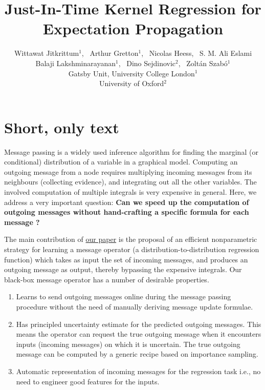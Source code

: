 \documentclass[a4paper,10pt]{article}
\title{Just-In-Time Kernel Regression for \\Expectation Propagation}
\author{
    Wittawat Jitkrittum$^1$, \, Arthur Gretton$^1$, \, Nicolas Heess, \, S. M. Ali Eslami \\
    \vspace{5mm}
    Balaji Lakshminarayanan$^1$, \, Dino Sejdinovic$^2$, \, Zolt{\'a}n Szab{\'o}$^1$ \\ 
%
Gatsby Unit, University College London$^1$ \\
University of Oxford$^2$ 
}
\begin{document}
\maketitle

\section*{Short, only text}

Message passing is a widely used inference algorithm for finding the marginal
(or conditional) distribution of a variable in a graphical model. Computing an
outgoing message from a node requires multiplying incoming messages from its
neighbours (collecting evidence), and integrating out all the other variables. 
The involved computation of multiple integrals is very expensive in general.
Here, we address a very important question: \textbf{Can we speed up the computation of outgoing
messages without hand-crafting a specific formula for each message ?}


The main contribution of \href{http://arxiv.org/abs/1503.02551}{our paper} is
the proposal of an efficient nonparametric strategy for learning a message
operator (a distribution-to-distribution regression function) which takes as
input the set of incoming messages, and produces an outgoing message as output,
thereby bypassing the expensive integrals.  Our black-box message operator has
a number of desirable properties.

\begin{enumerate}
    \item Learns to send outgoing messages online during the message
    passing procedure without the need of manually deriving message update
    formulae.  

    \item Has principled uncertainty estimate for the predicted outgoing
    messages.  This means the operator can request the true outgoing message
    when it encounters inputs (incoming messages) on which it is uncertain.  
    The true outgoing message can be computed by a generic recipe based on importance sampling.

    \item
    Automatic representation of incoming messages for the regression task i.e.,
    no need to engineer good features for the inputs.
\end{enumerate}
\end{document}
